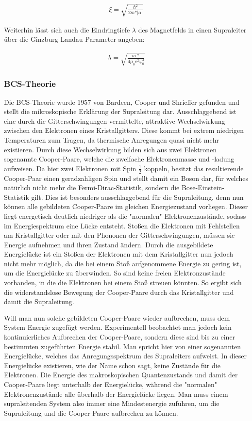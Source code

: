\begin{align}
\xi= \sqrt{\frac{\hslash^2}{2m*\vert\alpha\vert}}
\end{align}

Weiterhin lässt sich auch die Eindringtiefe $\lambda$ des Magnetfelds in einen Supraleiter über die Ginzburg-Landau-Parameter angeben:

\begin{align}
\lambda=\sqrt{\frac{m*}{4\mu_0e^2\psi_0^2}}
\end{align}


\subsubsection{BCS-Theorie}

Die BCS-Theorie wurde 1957 von Bardeen, Cooper und Shrieffer gefunden und stellt die mikroskopische Erklärung der Supraleitung dar. Ausschlaggebend ist eine durch die Gitterschwingungen vermittelte, attraktive Wechselwirkung zwischen den Elektronen eines Kristallgitters. Diese kommt bei extrem niedrigen Temperaturen zum Tragen, da thermische Anregungen quasi nicht mehr existieren. Durch diese Wechselwirkung bilden sich aus zwei Elektronen sogenannte Cooper-Paare, welche die zweifache Elektronenmasse und -ladung aufweisen. Da hier zwei Elektronen mit Spin $\frac{1}{2}$ koppeln, besitzt das resultierende Cooper-Paar einen geradzahligen Spin und stellt damit ein Boson dar, für welches natürlich nicht mehr die Fermi-Dirac-Statistik, sondern die Bose-Einstein-Statistik gilt. Dies ist besonders ausschlaggebend für die Supraleitung, denn nun können alle gebildeten Cooper-Paare im gleichen Energiezustand vorliegen. Dieser liegt energetisch deutlich niedriger als die "normalen" Elektronenzustände, sodass im Energiespektrum eine Lücke entsteht. Stoßen die Elektronen mit Fehlstellen am Kristallgitter oder mit den Phononen der Gitterschwingungen, müssen sie Energie aufnehmen und ihren Zustand ändern. Durch die ausgebildete Energielücke ist ein Stoßen der Elektronen mit dem Kristallgitter nun jedoch nicht mehr möglich, da die bei einem Stoß aufgenommene Energie zu gering ist, um die Energielücke zu überwinden. So sind keine freien Elektronzustände vorhanden, in die die Elektronen bei einem Stoß streuen könnten. So ergibt sich die widerstandslose Bewegung der Cooper-Paare durch das Kristallgitter und damit die Supraleitung. 

Will man nun solche gebildeten Cooper-Paare wieder aufbrechen, muss dem System Energie zugefügt werden. Experimentell beobachtet man jedoch kein kontinuierliches Aufbrechen der Cooper-Paare, sondern diese sind bis zu einer bestimmten zugeführten Energie stabil. Man spricht hier von einer sogenannten Energielücke, welches das Anregungsspektrum des Supraleiters aufweist. In dieser Energielücke existieren, wie der Name schon sagt, keine Zustände für die Elektronen. Die Energie des makroskopischen Quantenzustands und damit der Cooper-Paare liegt unterhalb der Energielücke, während die "normalen" Elektronenzustände alle überhalb der Energielücke liegen. Man muss einem supraleitenden System also immer eine Mindestenergie zuführen, um die Supraleitung und die Cooper-Paare aufbrechen zu können.



